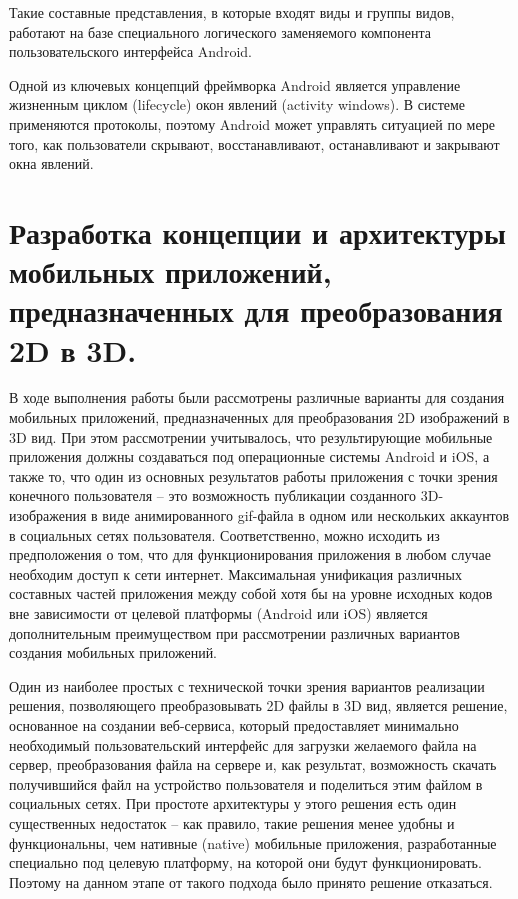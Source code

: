 Такие составные представления, в которые входят виды и группы видов, работают на базе специального логического заменяемого компонента пользовательского интерфейса Android.

Одной из ключевых концепций фреймворка Android является управление жизненным циклом (lifecycle) окон явлений (activity windows). В системе применяются протоколы, поэтому Android может управлять ситуацией по мере того, как пользователи скрывают, восстанавливают, останавливают и закрывают окна явлений.


\section{Разработка концепции и архитектуры мобильных приложений, предназначенных для преобразования 2D в 3D.}
В ходе выполнения работы были рассмотрены различные варианты для создания мобильных приложений, предназначенных для преобразования 2D изображений в 3D вид. При этом рассмотрении учитывалось, что результирующие мобильные приложения должны создаваться под операционные системы Android и iOS, а также то, что один из основных результатов работы приложения с точки зрения конечного пользователя – это возможность публикации созданного 3D-изображения в виде анимированного gif-файла в одном или нескольких аккаунтов в социальных сетях пользователя. Соответственно, можно исходить из предположения о том, что для функционирования приложения в любом случае необходим доступ к сети интернет. Максимальная унификация различных составных частей приложения между собой хотя бы на уровне исходных кодов вне зависимости от целевой платформы (Android или iOS) является дополнительным преимуществом при рассмотрении различных вариантов создания мобильных приложений.

Один из наиболее простых с технической точки зрения вариантов реализации решения, позволяющего преобразовывать 2D файлы в 3D вид, является решение, основанное на создании веб-сервиса, который предоставляет минимально необходимый пользовательский интерфейс для загрузки желаемого файла на сервер, преобразования файла на сервере и, как результат, возможность скачать получившийся файл на устройство пользователя и поделиться этим файлом в социальных сетях. При простоте архитектуры у этого решения есть один существенных недостаток – как правило, такие решения менее удобны и функциональны, чем нативные (native) мобильные приложения, разработанные специально под целевую платформу, на которой они будут функционировать. Поэтому на данном этапе от такого подхода было принято решение отказаться.

